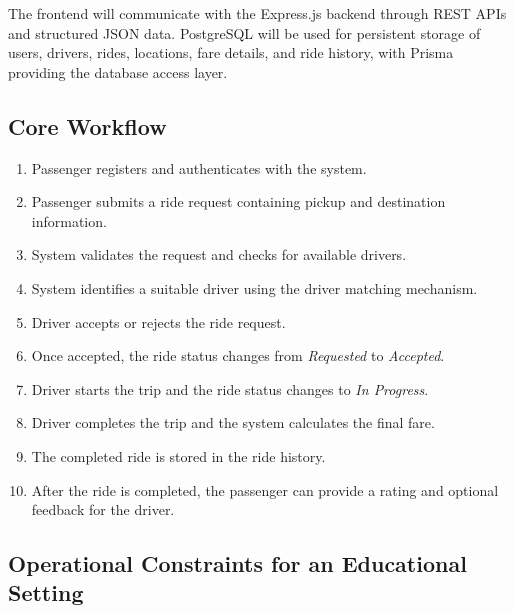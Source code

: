 \documentclass[11pt,a4paper]{article}
\begin{document}
The frontend will communicate with the Express.js backend through
REST APIs and structured JSON data. PostgreSQL will be used for
persistent storage of users, drivers, rides, locations, fare details,
and ride history, with Prisma providing the database access layer.


\subsection{Core Workflow}

\begin{enumerate}

    \item Passenger registers and authenticates with the system.

    \item Passenger submits a ride request containing pickup and
    destination information.

    \item System validates the request and checks for available
    drivers.

    \item System identifies a suitable driver using the driver
    matching mechanism.

    \item Driver accepts or rejects the ride request.

    \item Once accepted, the ride status changes from
    \textit{Requested} to \textit{Accepted}.

    \item Driver starts the trip and the ride status changes to
    \textit{In Progress}.

    \item Driver completes the trip and the system calculates the
    final fare.

    \item The completed ride is stored in the ride history.

    \item After the ride is completed, the passenger can provide
    a rating and optional feedback for the driver.

\end{enumerate}


\subsection{Operational Constraints for an Educational Setting}
\end{document}
